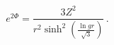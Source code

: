 \begin{equation}
e^{2\Phi} = \frac{3Z^2}{r^2\sinh^2 \left(\frac{\ln gr}{\sqrt 3}\right)}\,.
            \label{ellipt}
\end{equation}

